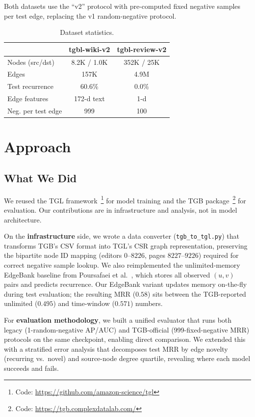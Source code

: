 \documentclass[10pt,twocolumn]{article}
\begin{document}
Both datasets use the ``v2'' protocol with pre-computed fixed negative samples per test edge, replacing the v1 random-negative protocol.

\begin{table}[t]
\centering
\caption{Dataset statistics.}
\label{tab:datasets}
\small
\begin{tabular}{lcc}
\toprule
 & \textbf{tgbl-wiki-v2} & \textbf{tgbl-review-v2} \\
\midrule
Nodes (src/dst) & 8.2K / 1.0K & 352K / 25K \\
Edges & 157K & 4.9M \\
Test recurrence & 60.6\% & 0.0\% \\
Edge features & 172-d text & 1-d \\
Neg. per test edge & 999 & 100 \\
\bottomrule
\end{tabular}
\end{table}

\section{Approach}

\subsection{What We Did}

We reused the TGL framework~\cite{zhou2022tgl}\footnote{Code: \url{https://github.com/amazon-science/tgl}} for model training and the TGB package~\cite{huang2024tgb}\footnote{Code: \url{https://tgb.complexdatalab.com/}} for evaluation.
Our contributions are in infrastructure and analysis, not in model architecture.

On the \textbf{infrastructure} side, we wrote a data converter (\texttt{tgb\_to\_tgl.py}) that transforms TGB's CSV format into TGL's CSR graph representation, preserving the bipartite node ID mapping (editors $0$--$8226$, pages $8227$--$9226$) required for correct negative sample lookup.
We also reimplemented the unlimited-memory EdgeBank baseline from Poursafaei et al.~\cite{poursafaei2022dgb}, which stores all observed $(u,v)$ pairs and predicts recurrence.
Our EdgeBank variant updates memory on-the-fly during test evaluation; the resulting MRR ($0.58$) sits between the TGB-reported unlimited ($0.495$) and time-window ($0.571$) numbers.

For \textbf{evaluation methodology}, we built a unified evaluator that runs both legacy (1-random-negative AP/AUC) and TGB-official (999-fixed-negative MRR) protocols on the same checkpoint, enabling direct comparison.
We extended this with a stratified error analysis that decomposes test MRR by edge novelty (recurring vs.\ novel) and source-node degree quartile, revealing where each model succeeds and fails.
\end{document}
